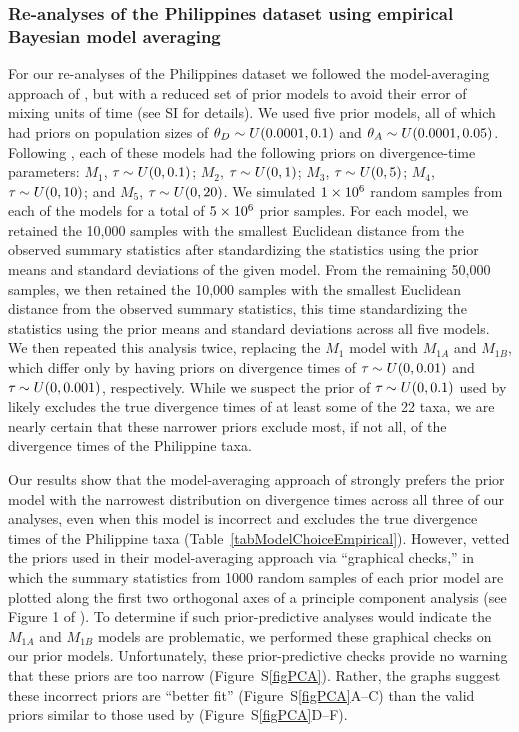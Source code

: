 \subsubsection{Re-analyses of the Philippines dataset using empirical Bayesian
model averaging}

For our re-analyses of the Philippines dataset we followed the model-averaging
approach of \citet{Hickerson2013}, but with a reduced set of prior models to
avoid their error of mixing units of time (see SI for details).
We used five prior models, all of which had priors on population sizes of
$\meanDescendantTheta{} \sim U(0.0001, 0.1)$ and $\ancestralTheta{} \sim
U(0.0001, 0.05)$.
Following \citet{Hickerson2013}, each of these models had the following
priors on divergence-time parameters:
$M_1$, $\tau_{} \sim U(0, 0.1)$;
$M_2$, $\tau_{} \sim U(0, 1)$;
$M_3$, $\tau_{} \sim U(0, 5)$;
$M_4$, $\tau_{} \sim U(0, 10)$; and
$M_5$, $\tau_{} \sim U(0, 20)$.
We simulated $1\times 10^{6}$ random samples from each of the models for a total of
$5\times 10^{6}$ prior samples.
For each model, we retained the 10,000 samples with the smallest Euclidean
distance from the observed summary statistics after standardizing the
statistics using the prior means and standard deviations of the given model.
From the remaining 50,000 samples, we then retained the 10,000 samples with the
smallest Euclidean distance from the observed summary statistics, this time
standardizing the statistics using the prior means and standard deviations
across all five models.
We then repeated this analysis twice, replacing the $M_1$ model with
$M_{1A}$ and $M_{1B}$, which differ only by having priors on divergence
times of $\tau_{} \sim U(0, 0.01)$ and $\tau_{} \sim U(0, 0.001)$,
respectively.
While we suspect the prior of $\tau_{} \sim U(0, 0.1)$ used by
\citet{Hickerson2013} likely excludes the true divergence times of at least
some of the 22 taxa, we are nearly certain that these narrower priors exclude
most, if not all, of the divergence times of the Philippine taxa.

Our results show that the model-averaging approach of \citet{Hickerson2013}
strongly prefers the prior model with the narrowest distribution on divergence
times across all three of our analyses, even when this model is incorrect and
excludes the true divergence times of the Philippine taxa
(Table~\ref{tabModelChoiceEmpirical}).
However, \citet{Hickerson2013} vetted the priors used in their model-averaging
approach via ``graphical checks,'' in which the summary statistics from 1000
random samples of each prior model are plotted along the first two orthogonal
axes of a principle component analysis (see Figure 1 of \citet{Hickerson2013}).
To determine if such prior-predictive analyses would indicate the $M_{1A}$ and
$M_{1B}$ models are problematic, we performed these graphical checks on our
prior models.
Unfortunately, these prior-predictive checks provide no warning that these
priors are too narrow (Figure~S\ref{figPCA}).
Rather, the graphs suggest these incorrect priors are ``better fit''
(Figure~S\ref{figPCA}A--C) than the valid priors similar to those used by
\citet{Oaks2012} (Figure~S\ref{figPCA}D--F).

